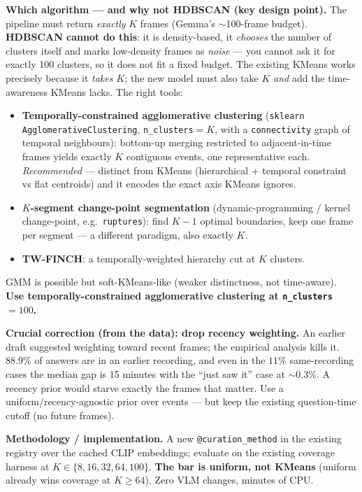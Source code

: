 \documentclass[11pt]{article}
\newcommand{\code}[1]{\texttt{#1}}
\begin{document}
\textbf{Which algorithm --- and why not HDBSCAN (key design point).} The pipeline must return \emph{exactly} $K$ frames (Gemma's $\sim$100-frame budget). \textbf{HDBSCAN cannot do this}: it is density-based, it \emph{chooses} the number of clusters itself and marks low-density frames as \emph{noise} --- you cannot ask it for exactly 100 clusters, so it does not fit a fixed budget. The existing KMeans works precisely because it \emph{takes $K$}; the new model must also take $K$ \emph{and} add the time-awareness KMeans lacks. The right tools:
\begin{itemize}[leftmargin=1.3em,topsep=1pt,itemsep=1pt]
\item \textbf{Temporally-constrained agglomerative clustering} (\code{sklearn AgglomerativeClustering}, \code{n\_clusters}$=K$, with a \code{connectivity} graph of temporal neighbours): bottom-up merging restricted to adjacent-in-time frames yields exactly $K$ contiguous events, one representative each. \emph{Recommended} --- distinct from KMeans (hierarchical + temporal constraint vs flat centroids) and it encodes the exact axis KMeans ignores.
\item \textbf{$K$-segment change-point segmentation} (dynamic-programming / kernel change-point, e.g.\ \code{ruptures}): find $K{-}1$ optimal boundaries, keep one frame per segment --- a different paradigm, also exactly $K$.
\item \textbf{TW-FINCH}: a temporally-weighted hierarchy cut at $K$ clusters.
\end{itemize}
GMM is possible but soft-KMeans-like (weaker distinctness, not time-aware). \textbf{Use temporally-constrained agglomerative clustering at \code{n\_clusters}$=100$.}

\textbf{Crucial correction (from the data): drop recency weighting.} An earlier draft suggested weighting toward recent frames; the empirical analysis kills it. $88.9\%$ of answers are in an earlier recording, and even in the $11\%$ same-recording cases the median gap is 15 minutes with the ``just saw it'' case at $\sim$0.3\%. A recency prior would starve exactly the frames that matter. Use a uniform/recency-agnostic prior over events --- but keep the existing question-time cutoff (no future frames).

\textbf{Methodology / implementation.} A new \code{@curation\_method} in the existing registry over the cached CLIP embeddings; evaluate on the existing coverage harness at $K\in\{8,16,32,64,100\}$. \textbf{The bar is uniform, not KMeans} (uniform already wins coverage at $K\ge 64$). Zero VLM changes, minutes of CPU.
\end{document}
